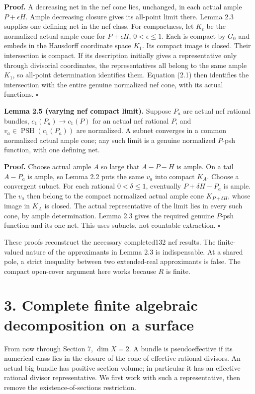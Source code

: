 \documentclass[
  10pt,
]{article}
\begin{document}
\textbf{Proof.} A decreasing net in the nef cone lies, unchanged, in
each actual ample \(P+\epsilon H\). Ample decreasing closure gives its
all-point limit there. Lemma 2.3 supplies one defining net in the nef
class. For compactness, let \(K_\epsilon\) be the normalized actual
ample cone for \(P+\epsilon H\), \(0<\epsilon\leq1\). Each is compact by
\(G_0\) and embeds in the Hausdorff coordinate space \(K_1\). Its
compact image is closed. Their intersection is compact. If its
description initially gives a representative only through divisorial
coordinates, the representatives all belong to the same ample \(K_1\),
so all-point determination identifies them. Equation (2.1) then
identifies the intersection with the entire genuine normalized nef cone,
with its actual functions. \(\square\)

\textbf{Lemma 2.5 (varying nef compact limit).} Suppose \(P_a\) are
actual nef rational bundles, \(c_1(P_a)\to c_1(P)\) for an actual nef
rational \(P\), and \(v_a\in\operatorname{PSH}(c_1(P_a))\) are
normalized. A subnet converges in a common normalized actual ample cone;
any such limit is a genuine normalized \(P\)-psh function, with one
defining net.

\textbf{Proof.} Choose actual ample \(A\) so large that \(A-P-H\) is
ample. On a tail \(A-P_a\) is ample, so Lemma 2.2 puts the same \(v_a\)
into compact \(K_A\). Choose a convergent subnet. For each rational
\(0<\delta\leq1\), eventually \(P+\delta H-P_a\) is ample. The \(v_a\)
then belong to the compact normalized actual ample cone
\(K_{P+\delta H}\), whose image in \(K_A\) is closed. The actual
representative of the limit lies in every such cone, by ample
determination. Lemma 2.3 gives the required genuine \(P\)-psh function
and its one net. This uses subnets, not countable extraction.
\(\square\)

These proofs reconstruct the necessary completed132 nef results. The
finite-valued nature of the approximants in Lemma 2.3 is indispensable.
At a shared pole, a strict inequality between two extended-real
approximants is false. The compact open-cover argument here works
because \(R\) is finite.

\section{3. Complete finite algebraic decomposition on a
surface}\label{complete-finite-algebraic-decomposition-on-a-surface}

From now through Section 7, \(\dim X=2\). A bundle is pseudoeffective if
its numerical class lies in the closure of the cone of effective
rational divisors. An actual big bundle has positive section volume; in
particular it has an effective rational divisor representative. We first
work with such a representative, then remove the existence-of-sections
restriction.
\end{document}

